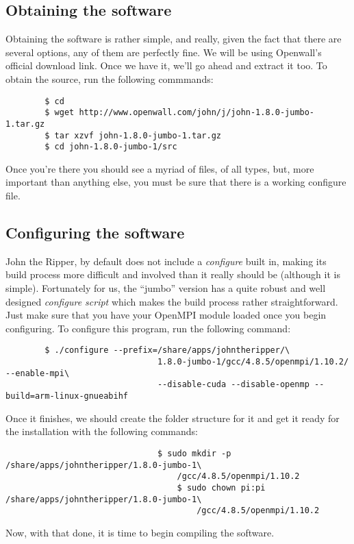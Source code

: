 \documentclass[]{article}
\begin{document}
        \subsection{Obtaining the software}
        Obtaining the software is rather simple, and really, given the fact that there are several options, any of them are perfectly fine. We
        will be using Openwall's official download link. Once we have it, we'll go ahead and extract it too. To obtain the source, run the 
        following commmands:
        \begin{lstlisting}
        $ cd
        $ wget http://www.openwall.com/john/j/john-1.8.0-jumbo-1.tar.gz
        $ tar xzvf john-1.8.0-jumbo-1.tar.gz
        $ cd john-1.8.0-jumbo-1/src
        \end{lstlisting}
        Once you're there you should see a myriad of files, of all types, but, more important than anything else, you must be sure that there 
        is a working configure file.

        \subsection{Configuring the software}
        John the Ripper, by default does not include a \textit{configure} built in, making its build process more difficult and involved than 
        it really should be (although it is simple). Fortunately for us, the ``jumbo'' version has a quite robust and well designed 
        \textit{configure script} which makes the build process rather straightforward. Just make sure that you have your OpenMPI module loaded 
        once you begin configuring. To configure this program, run the following command:
        \begin{lstlisting}
        $ ./configure --prefix=/share/apps/johntheripper/\
                               1.8.0-jumbo-1/gcc/4.8.5/openmpi/1.10.2/ --enable-mpi\
                               --disable-cuda --disable-openmp --build=arm-linux-gnueabihf
                               \end{lstlisting}
                               Once it finishes, we should create the folder structure for it and get it ready for the installation with the following commands:
                               \begin{lstlisting}
                               $ sudo mkdir -p /share/apps/johntheripper/1.8.0-jumbo-1\
                                   /gcc/4.8.5/openmpi/1.10.2
                                   $ sudo chown pi:pi /share/apps/johntheripper/1.8.0-jumbo-1\
                                       /gcc/4.8.5/openmpi/1.10.2
                                       \end{lstlisting}
                                       Now, with that done, it is time to begin compiling the software.
\end{document}
